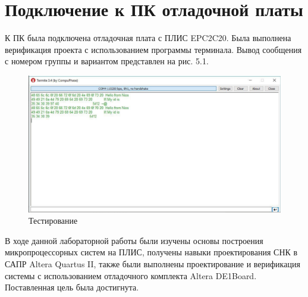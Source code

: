\chapter{Подключение к ПК отладочной платы}

К ПК была подключена отладочная плата с ПЛИС EPC2C20. Была выполнена верификация проекта с использованием программы терминала. Вывод сообщения с номером группы и вариантом представлен на рис. 5.1.
\begin{figure}[H]
	\begin{center}
		\includegraphics[scale=0.42]{assets/view.png}
	\end{center}
	\caption{Тестирование}
\end{figure}


В ходе данной лабораторной работы были изучены основы построения
микропроцессорных систем на ПЛИС, получены навыки проектирования
СНК в САПР Altera Quartus II, также были выполнены проектирование
и верификация системы с использованием отладочного комплекта Altera
DE1Board. Поставленная цель была достигнута. 